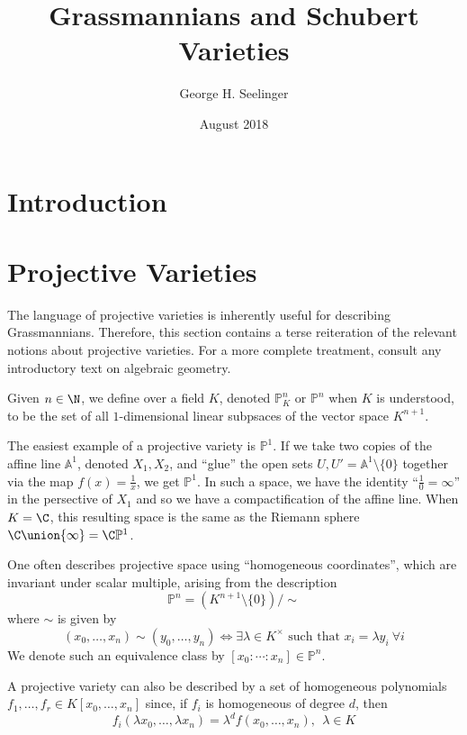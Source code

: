\documentclass[11pt,leqno,oneside]{amsart}
\title[Grassmannians and Schubert Varieties]{Grassmannians and
  Schubert Varieties}
\author{George H. Seelinger}
\date{August 2018}
\numberwithin{thm}{section}
\renewcommand{\P}{\mathbb{P}}
\newcommand{\A}{\mathbb{A}}
\begin{document}
\maketitle
\section{Introduction}
\section{Projective Varieties}
The language of projective varieties is inherently useful for
describing Grassmannians. Therefore, this section contains a terse
reiteration of the relevant notions about projective varieties. For a
more complete treatment, consult any introductory text on algebraic
geometry. 
\begin{defn}
  Given \(n \in \N\), we define  over a
  field \(K\), denoted \(\P_K^n\) or \(\P^n\) when \(K\) is
  understood, to be the set of all 
  \(1\)-dimensional linear subpsaces of the vector space \(K^{n+1}\). 
\end{defn}
\begin{example}
  The easiest example of a projective variety is \(\P^1\). If we take
  two copies of the affine line \(\A^1\), denoted \(X_1, X_2\), and
  ``glue'' the open sets \(U,U' = \A^1 \setminus \{0\}\) together via
  the map \(f(x) = \frac{1}{x}\), we get \(\P^1\). In such a space, we
  have the identity ``\(\frac{1}{0} = \infty\)'' in the persective of
  \(X_1\) and so we have a compactification of the affine line. When
  \(K=\C\), this 
  resulting space is the same as the Riemann sphere \(\C \union
  \{\infty\} = \C\P^1\).
\end{example}
\begin{rmk}
  One often describes projective space using ``homogeneous coordinates'',
  which are invariant under scalar multiple, arising from the
  description \[
    \P^n = (K^{n+1} \setminus \{0\})/\sim
  \]
  where \(\sim\) is given by \[
    (x_0, \ldots, x_n) \sim (y_0, \ldots, y_n) \iff \exists \lambda
    \in K^\times \text{ such that } x_i = \lambda y_i \ \forall i
  \]
  We denote such an equivalence class by \([x_0:\cdots:x_n] \in \P^n\).
\end{rmk}
A projective variety can also be described by a set of homogeneous
polynomials \(f_1, \ldots, f_r \in K[x_0,\ldots,x_n]\) since, if
\(f_i\) is homogeneous of degree \(d\), then \[
  f_i(\lambda x_0, \ldots, \lambda x_n) = \lambda^d f(x_0, \ldots,
  x_n), \ \ \lambda \in K
\]
\end{document}

